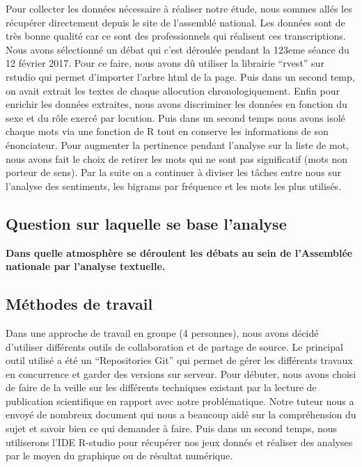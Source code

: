 \documentclass[]{article}
\begin{document}
Pour collecter les données nécessaire à réaliser notre étude, nous
sommes allés les récupérer directement depuis le site de l'assemblé
national. Les données sont de très bonne qualité car ce sont des
professionnels qui réalisent ces transcriptions. Nous avons sélectionné
un débat qui c'est déroulée pendant la 123eme séance du 12 février 2017.
Pour ce faire, nous avons dû utiliser la librairie ``rvest'' sur rstudio
qui permet d'importer l'arbre html de la page. Puis dans un second temp,
on avait extrait les textes de chaque allocution chronologiquement.
Enfin pour enrichir les données extraites, nous avons discriminer les
données en fonction du sexe et du rôle exercé par locution. Puis dans un
second temps nous avons isolé chaque mots via une fonction de R tout en
conserve les informations de son énonciateur. Pour augmenter la
pertinence pendant l'analyse sur la liste de mot, nous avons fait le
choix de retirer les mots qui ne sont pas significatif (mots non porteur
de sens). Par la suite on a continuer à diviser les tâches entre nous
sur l'analyse des sentiments, les bigrams par fréquence et les mots les
plus utilisés.

\subsection{Question sur laquelle se base
l'analyse}\label{question-sur-laquelle-se-base-lanalyse}

\textbf{Dans quelle atmosphère se déroulent les débats au sein de
l'Assemblée nationale par l'analyse textuelle.}

\subsection{Méthodes de travail}\label{methodes-de-travail}

Dans une approche de travail en groupe (4 personnes), nous avons décidé
d'utiliser différents outils de collaboration et de partage de source.
Le principal outil utilisé a été un ``Repositories Git'' qui permet de
gérer les différents travaux en concurrence et garder des versions sur
serveur. Pour débuter, nous avons choisi de faire de la veille sur les
différents techniques existant par la lecture de publication
scientifique en rapport avec notre problématique. Notre tuteur nous a
envoyé de nombreux document qui nous a beaucoup aidé sur la
compréhension du sujet et savoir bien ce qui demander à faire. Puis dans
un second temps, nous utiliserons l'IDE R-studio pour récupérer nos jeux
donnés et réaliser des analyses par le moyen du graphique ou de résultat
numérique.
\end{document}
